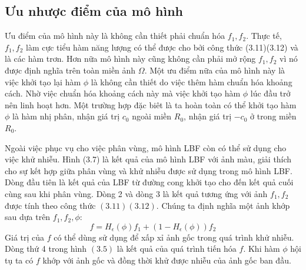 \documentclass[12pt, oneside, a4paper]{book}
\begin{document}
\subsection{Ưu nhược điểm của mô hình}
Ưu điểm của mô hình này là không cần thiết phải chuẩn hóa $f_1, f_2$. Thực tế, $f_1, f_2$ làm cực tiểu hàm năng lượng có thể được cho bởi công thức (3.11)(3.12) và là các hàm trơn. Hơn nữa mô hình này cũng không cần phải mở rộng $f_1, f_2$ vì nó được định nghĩa trên toàn miền ảnh $\Omega$. Một ưu điểm nữa của mô hình này là việc khởi tạo lại hàm $\phi$ là không cần thiết do việc thêm hàm chuẩn hóa khoảng cách. Nhờ việc chuẩn hóa khoảng cách này mà việc khởi tạo hàm $\phi$ lúc đầu trở nên linh hoạt hơn. Một trường hợp đặc biêt là ta hoàn toàn có thể khởi tạo hàm $\phi$ là hàm nhị phân, nhận giá trị $c_0$ ngoài miền $R_0$, nhận giá trị $-c_0$ ở trong miền $R_0$.

Ngoài việc phục vụ cho việc phân vùng, mô hình LBF còn có thể sử dụng cho việc khử nhiễu. Hình (3.7) là kết quả của mô hình LBF với ảnh màu, giải thích cho sự kết hợp giữa phân vùng và khử nhiễu được sử dụng trong mô hình LBF. Dòng đầu tiên là kết quả của LBF từ đường cong khởi tạo cho đến kết quả cuối cùng sau khi phân vùng. Dòng 2 và dòng 3 là kết quả tương ứng với ảnh $f_1, f_2$ được tính theo công thức $(3.11)(3.12)$. Chúng ta định nghĩa một ảnh khớp sau dựa trên $f_1, f_2, \phi$:
\begin{equation*}
f=H_{\epsilon}(\phi)f_1+(1-H_{\epsilon}(\phi))f_2
\end{equation*}
Giá trị của $f$ có thể dùng sử dụng để xấp xỉ ảnh gốc trong quá trình khử nhiễu. Dòng thứ 4 trong hình $(3.5)$ là kết quả của quá trình tiến hóa $f$. Khi hàm $\phi$ hội tụ ta có $f$ khớp với ảnh gốc và đồng thời khử được nhiễu của ảnh gốc ban đầu. 
\end{document}
